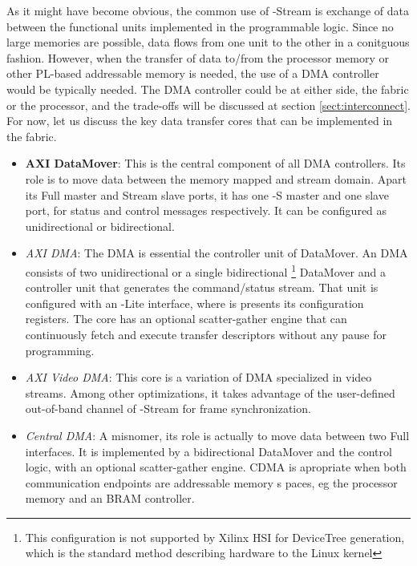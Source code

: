 As it might have become obvious, the common use of -Stream is exchange of data between the
functional units implemented in the programmable logic. Since no large memories are possible,
data flows from one unit to the other in a conitguous fashion. However, when the transfer of data
to/from the processor memory or other PL-based addressable memory is needed, the use of a DMA
controller would be typically needed. The DMA controller could be at either side, 
the fabric or the processor, and the trade-offs will be discussed at section \ref{sect:interconnect}.
For now, let us discuss the key data transfer cores that can be implemented in the fabric.
\begin{itemize}

\item	\textbf{AXI DataMover}: This is the central component of all DMA controllers.
	Its role is to move data between the memory mapped and stream domain.
	Apart its Full  master and  Stream slave ports, 
	it has one -S master and one slave port, 
	for status and control messages respectively.
	It can be configured as unidirectional or bidirectional.
\item	\emph{AXI DMA}: The  DMA is essential the controller unit of DataMover. 
	An  DMA consists of two unidirectional or a single bidirectional
	\footnote{This configuration is not supported by Xilinx HSI for DeviceTree generation,
	which is the standard method describing hardware to the Linux kernel}
	DataMover and a controller unit that generates the command/status stream.
	That unit is configured with an -Lite interface, where is presents its configuration registers.
	The core has an optional scatter-gather engine that can continuously fetch and execute
	transfer descriptors without any pause for programming.
\item	\emph{AXI Video DMA}: This core is a variation of  DMA specialized in video streams.
	Among other optimizations, it takes advantage of the user-defined out-of-band channel
	of -Stream for frame synchronization.
\item	\emph{Central DMA}: A misnomer, its role is actually to move data between two Full  interfaces.
	It is implemented by a bidirectional DataMover and the control logic, with an optional
	scatter-gather engine. CDMA is apropriate when both communication endpoints are addressable
	memory s paces, eg the processor memory and an  BRAM controller.
\end{itemize}


